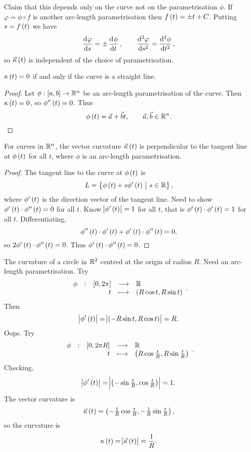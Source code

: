 Claim that this depends only on the curve not on the parametrisation $ \phi $. If $ \varphi = \phi \circ f $ is another arc-length parametrisation then $ f\br{t} = \pm t + C $. Putting $ s = f\br{t} $ we have
$$ \dod{\varphi}{s} = \pm\dod{\phi}{t}, \qquad \dod[2]{\varphi}{s} = \dod[2]{\phi}{t}, $$
so $ \vec{\kappa}\br{t} $ is independent of the choice of parametrisation.

\begin{proposition}
$ \kappa\br{t} = 0 $ if and only if the curve is a straight line.
\end{proposition}

\begin{proof}
Let $ \phi : \sbr{a, b} \to \RR^n $ be an arc-length parametrisation of the curve. Then $ \kappa\br{t} = 0 $, so $ \phi''\br{t} = 0 $. Thus
$$ \phi\br{t} = \vec{a} + \vec{b}t, \qquad \vec{a}, \vec{b} \in \RR^n. $$
\end{proof}

\begin{proposition}
For curves in $ \mathbb{R}^n $, the vector curvature $ \vec{\kappa}\br{t} $ is perpendicular to the tangent line at $ \phi\br{t} $ for all $ t $, where $ \phi $ is an arc-length parametrisation.
\end{proposition}

\begin{proof}
The tangent line to the curve at $ \phi\br{t} $ is
$$ L = \cbr{\phi\br{t} + s\phi'\br{t} \st s \in \RR}, $$
where $ \phi'\br{t} $ is the direction vector of the tangent line. Need to show $ \phi'\br{t} \cdot \phi''\br{t} = 0 $ for all $ t $. Know $ \abs{\phi'\br{t}} = 1 $ for all $ t $, that is $ \phi'\br{t} \cdot \phi'\br{t} = 1 $ for all $ t $. Differentiating,
$$ \phi''\br{t} \cdot \phi'\br{t} + \phi'\br{t} \cdot \phi''\br{t} = 0, $$
so $ 2\phi'\br{t} \cdot \phi''\br{t} = 0 $. Thus $ \phi'\br{t} \cdot \phi''\br{t} = 0 $.
\end{proof}

\begin{example*}
The curvature of a circle in $ \mathbb{R}^2 $ centred at the origin of radius $ R $. Need an arc-length parametrisation. Try
$$ \function[\phi]{\sbr{0, 2\pi}}{\RR}{t}{\br{R\cos t, R\sin t}}. $$
Then
$$ \abs{\phi'\br{t}} = \abs{\br{-R\sin t, R\cos t}} = R. $$
Oops. Try
$$ \function[\phi]{\sbr{0, 2\pi R}}{\RR}{t}{\br{R\cos \tfrac{t}{R}, R\sin \tfrac{t}{R}}}. $$
Checking,
$$ \abs{\phi'\br{t}} = \abs{\br{-\sin \tfrac{t}{R}, \cos \tfrac{t}{R}}} = 1. $$
The vector curvature is
$$ \vec{\kappa}\br{t} = \br{-\tfrac{1}{R}\cos \tfrac{t}{R}, -\tfrac{1}{R}\sin \tfrac{t}{R}}, $$
so the curvature is
$$ \kappa\br{t} = \abs{\vec{\kappa}\br{t}} = \dfrac{1}{R}. $$
\end{example*}

